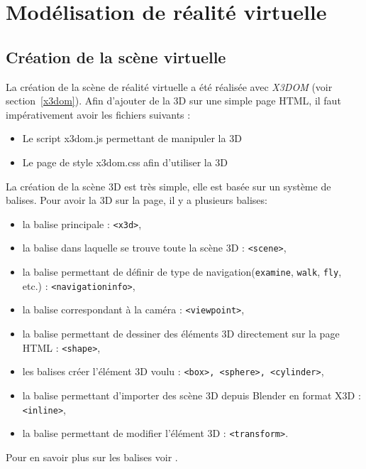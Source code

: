 \section{Modélisation de réalité virtuelle} \label{realiteVirtuelle}

\subsection{Création de la scène virtuelle}  \label{creation}
La création de la scène de réalité virtuelle a été réalisée avec \textit{X3DOM} (voir section~\ref{x3dom}). Afin d'ajouter de la 3D sur une simple page HTML, il faut impérativement avoir les fichiers suivants : 

\begin{itemize}
\item Le script x3dom.js permettant de manipuler la 3D
\item Le page de style x3dom.css afin d'utiliser la 3D \\

\end{itemize}

La création de la scène 3D est très simple, elle est basée sur un système de balises. Pour avoir la 3D sur la page, il y a plusieurs balises:

\begin{itemize}
\item la balise principale : \texttt{<x3d>}, 
\item la balise dans laquelle se trouve toute la scène 3D : \texttt{<scene>}, 
\item la balise permettant de définir de type de navigation(\texttt{examine}, \texttt{walk}, \texttt{fly}, etc.) : \texttt{<navigationinfo>},
\item la balise correspondant à la caméra : \texttt{<viewpoint>},
\item la balise permettant de dessiner des éléments 3D directement sur la page HTML : \texttt{<shape>}, 
\item les balises créer l'élément 3D voulu : \texttt{<box>, <sphere>, <cylinder>},
\item la balise permettant d'importer des scène 3D depuis Blender en format X3D : \texttt{<inline>}, 
\item la balise permettant de modifier l'élément 3D : \texttt{<transform>}.
\end{itemize}
Pour en savoir plus sur les balises voir \cite{NodesX3DOM}. \\
 

